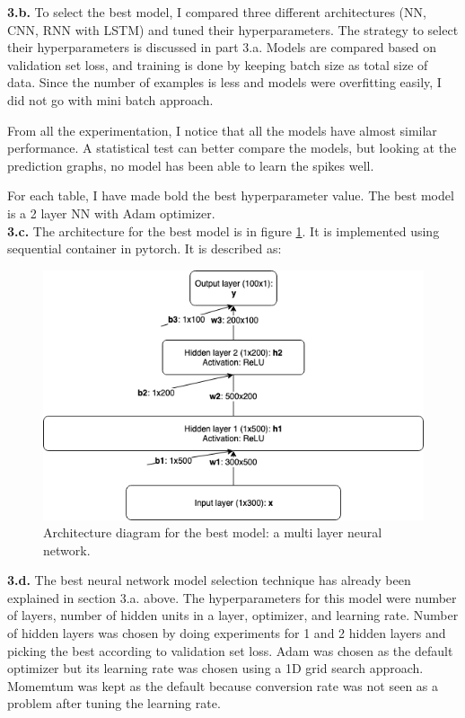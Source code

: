 \documentclass[11pt]{article}
\begin{document}
\textbf{3.b.}
To select the best model, I compared three different architectures (NN, CNN, RNN with LSTM) and tuned their hyperparameters. The strategy to select their hyperparameters is discussed in part 3.a. Models are compared based on validation set loss, and training is done by keeping batch size as total size of data. Since the number of examples is less and models were overfitting easily, I did not go with mini batch approach.

From all the experimentation, I notice that all the models have almost similar performance. A statistical test can better compare the models, but looking at the prediction graphs, no model has been able to learn the spikes well.

For each table, I have made bold the best hyperparameter value. The best model is a 2 layer NN with Adam optimizer. \\

\textbf{3.c.} The architecture for the best model is in figure \ref{fig:best_nn}. It is implemented using sequential container in pytorch. It is described as:

\begin{figure}[h]
	\includegraphics[scale=0.5]{best_nn.png}
	\centering
	\caption{Architecture diagram for the best model: a multi layer neural network.}
	\label{fig:best_nn}
\end{figure}

\textbf{3.d.} The best neural network model selection technique has already been explained in section 3.a. above. The hyperparameters for this model were number of layers, number of hidden units in a layer, optimizer, and learning rate. Number of hidden layers was chosen by doing experiments for 1 and 2 hidden layers and picking the best according to validation set loss. Adam was chosen as the default optimizer but its learning rate was chosen using a 1D grid search approach. Momemtum was kept as the default because conversion rate was not seen as a problem after tuning the learning rate. \\
\end{document}
